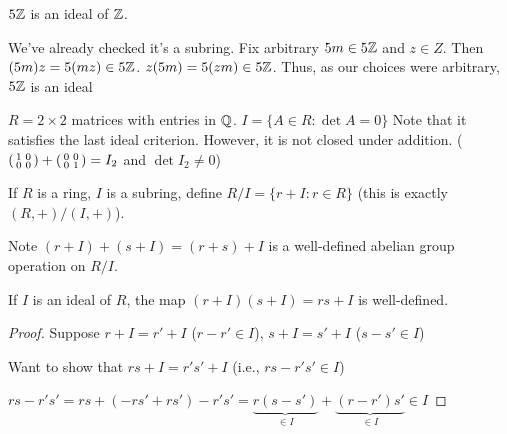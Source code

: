 \documentclass[notes.tex]{subfiles}
\begin{document}
\begin{eg}
	$5\mathbb{Z}$ is an ideal of $\mathbb{Z}$.

	We've already checked it's a subring.
	Fix arbitrary $5m\in 5\mathbb{Z}$ and $z\in Z$.
	Then $(5m)z = 5(mz) \in 5\mathbb{Z}$.
	$z(5m) = 5(zm) \in 5\mathbb{Z}$. Thus, as our choices were arbitrary, $5\mathbb{Z}$ is an ideal
\end{eg}

\begin{eg}
$R = 2\times 2$ matrices with entries in $\mathbb{Q}$.
$I = \{A\in R : \det A = 0\}$
Note that it satisfies the last ideal criterion. However, it is not closed under addition. ($\smattwo 1,0|0,0 + \smattwo 0,0|0,1 = I_2$ and $\det I_2 \ne 0$)
\end{eg}

\begin{defn}
	If $R$ is a ring, $I$ is a subring, define $R/I = \{r+I : r\in R\}$ (this is exactly $(R, +)/(I, +)$).
\end{defn}

Note $(r + I) + (s + I) = (r + s) + I$ is a well-defined abelian group operation on $R/I$.

\begin{proposition}
	If $I$ is an ideal of $R$, the map $(r + I)(s + I) = rs + I$ is well-defined.
\end{proposition}
\begin{proof}
	Suppose $r + I = r' + I$ ($r - r' \in I$), $s + I = s' + I$ ($s - s' \in I$)

	Want to show that $rs + I = r's' + I$ (i.e., $rs-r's' \in I$)

	$rs - r's' = rs + (-rs' + rs') - r's' = \underbrace{r(s-s')}_{\in I} + \underbrace{(r-r')s'}_{\in I}\in I$
\end{proof}
\end{document}
